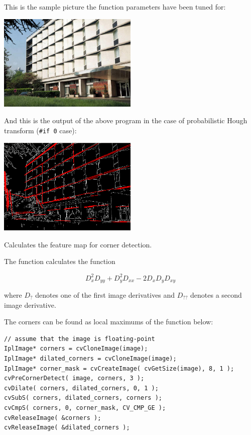 This is the sample picture the function parameters have been tuned for:

\includegraphics[width=0.5\textwidth]{pics/building.jpg}

And this is the output of the above program in the case of probabilistic Hough transform (\texttt{\#if 0} case):

\includegraphics[width=0.5\textwidth]{pics/houghp.png}
\fi

Calculates the feature map for corner detection.

\begin{description}
\end{description}

The function calculates the function

\[
D_x^2 D_{yy} + D_y^2 D_{xx} - 2 D_x D_y D_{xy}
\]

where $D_?$ denotes one of the first image derivatives and $D_{??}$ denotes a second image derivative.

The corners can be found as local maximums of the function below:

\ifC
\begin{lstlisting}
// assume that the image is floating-point
IplImage* corners = cvCloneImage(image);
IplImage* dilated_corners = cvCloneImage(image);
IplImage* corner_mask = cvCreateImage( cvGetSize(image), 8, 1 );
cvPreCornerDetect( image, corners, 3 );
cvDilate( corners, dilated_corners, 0, 1 );
cvSubS( corners, dilated_corners, corners );
cvCmpS( corners, 0, corner_mask, CV_CMP_GE );
cvReleaseImage( &corners );
cvReleaseImage( &dilated_corners );
\end{lstlisting}

